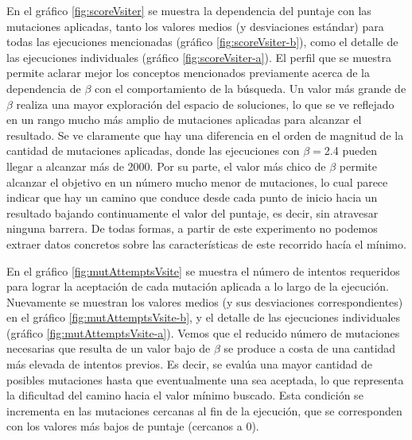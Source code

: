 En el gráfico \ref{fig:scoreVsiter} se muestra la dependencia del puntaje con las mutaciones aplicadas, tanto los valores medios (y desviaciones estándar) para todas las ejecuciones mencionadas (gráfico \ref{fig:scoreVsiter-b}), 
como el detalle de las ejecuciones individuales (gráfico \ref{fig:scoreVsiter-a}).
El perfil que se muestra permite aclarar mejor los conceptos mencionados previamente acerca de la dependencia de $\beta$ con el comportamiento de la búsqueda. 
Un valor más grande de $\beta$ realiza una mayor exploración del espacio de soluciones, lo que se ve reflejado en un rango mucho más amplio de mutaciones aplicadas para alcanzar el resultado.
Se ve claramente que hay una diferencia en el orden de magnitud de la cantidad de mutaciones aplicadas, donde las ejecuciones con $\beta=$2.4 pueden llegar a alcanzar más de 2000.
Por su parte, el valor más chico de $\beta$ permite alcanzar el objetivo en un número mucho menor de mutaciones, lo cual parece indicar que hay un camino 
que conduce desde cada punto de inicio hacia un resultado bajando continuamente el valor del puntaje, es decir, sin atravesar ninguna barrera.
De todas formas, a partir de este experimento no podemos extraer datos concretos sobre las características de este recorrido hacía el mínimo.

En el gráfico \ref{fig:mutAttemptsVsite} se muestra el número de intentos requeridos para lograr la aceptación de cada mutación aplicada a lo largo de la ejecución.
Nuevamente se muestran los valores medios (y sus desviaciones correspondientes) en el gráfico \ref{fig:mutAttemptsVsite-b}, y el detalle de las ejecuciones individuales (gráfico \ref{fig:mutAttemptsVsite-a}).
Vemos que el reducido número de mutaciones necesarias que resulta de un valor bajo de $\beta$ se produce a costa de una cantidad más elevada de intentos previos.
Es decir, se evalúa una mayor cantidad de posibles mutaciones hasta que eventualmente una sea aceptada, lo que representa la dificultad del camino hacia el valor mínimo buscado. 
Esta condición se incrementa en las mutaciones cercanas al fin de la ejecución, que se corresponden con los valores más bajos de puntaje (cercanos a 0). 




